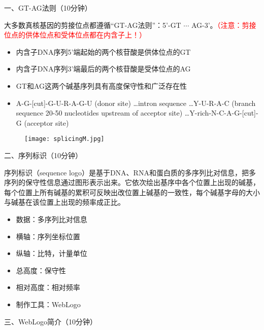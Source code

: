 \documentclass{TIJMUjiaoanSY}
\begin{document}

\firstTail


\newpage
\otherHeader

\noindent
一、GT-AG法则（10分钟）

大多数真核基因的剪接位点都遵循“GT-AG法则”：5'-GT $\cdots$ AG-3'。\textcolor{red}{（注意：剪接位点的供体位点和受体位点都在内含子上！）}
\begin{itemize}
  \item 内含子DNA序列5'端起始的两个核苷酸是供体位点的GT
  \item 内含子DNA序列3'端最后的两个核苷酸是受体位点的AG
  \item GT和AG这两个碱基序列具有高度保守性和广泛存在性
  \item A-G-[cut]-G-U-R-A-G-U (donor site) \ldots intron sequence \ldots Y-U-R-A-C (branch sequence 20-50 nucleotides upstream of acceptor site) \ldots Y-rich-N-C-A-G-[cut]-G (acceptor site)
\end{itemize}

\begin{figure}[ht]
  \centering
  \texttt{[image: splicingM.jpg]}
\end{figure}

\vspace*{0.2cm}
\noindent
二、序列标识（10分钟）

序列标识（sequence logo）是基于DNA、RNA和蛋白质的多序列比对信息，把多序列的保守性信息通过图形表示出来。它依次绘出基序中各个位置上出现的碱基，每个位置上所有碱基的累积可反映出改位置上碱基的一致性，每个碱基字母的大小与碱基在该位置上出现的频率成正比。
\begin{itemize}
  \item 数据：多序列比对信息
  \item 横轴：序列坐标位置
  \item 纵轴：比特，计量单位
  \item 总高度：保守性
  \item 相对高度：相对频率
  \item 制作工具：WebLogo
\end{itemize}

\vspace*{0.2cm}
\noindent
三、WebLogo简介（10分钟）
\end{document}
